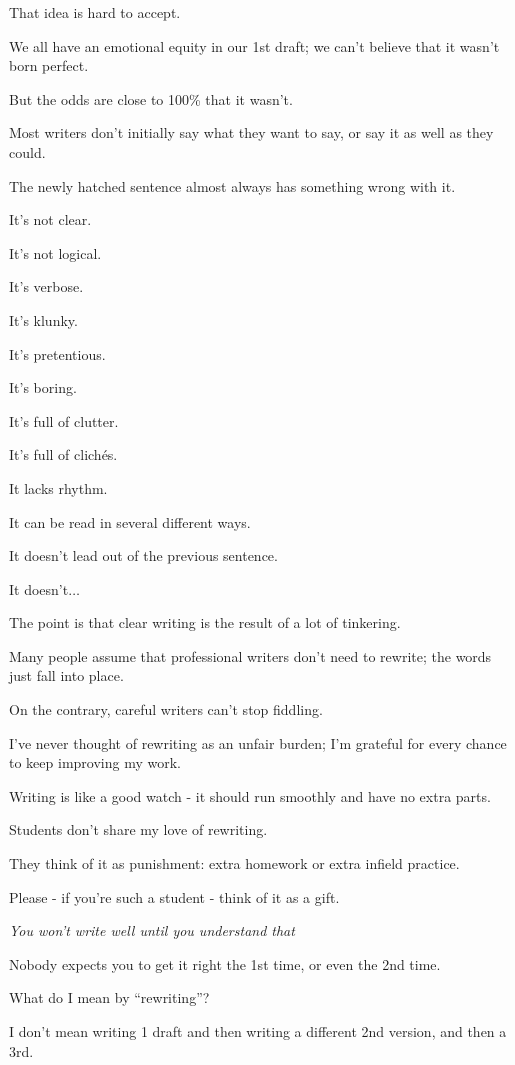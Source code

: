 \documentclass{book}
\numberwithin{equation}{section}
\begin{document}
That idea is hard to accept.

We all have an emotional equity in our 1st draft; we can't believe that it wasn't born perfect.

But the odds are close to 100\% that it wasn't.

Most writers don't initially say what they want to say, or say it as well as they could.

The newly hatched sentence almost always has something wrong with it.

It's not clear.

It's not logical.

It's verbose.

It's klunky.

It's pretentious.

It's boring.

It's full of clutter.

It's full of clich\'es.

It lacks rhythm.

It can be read in several different ways.

It doesn't lead out of the previous sentence.

It doesn't$\ldots$

The point is that clear writing is the result of a lot of tinkering.

%
Many people assume that professional writers don't need to rewrite; the words just fall into place.

On the contrary, careful writers can't stop fiddling.

I've never thought of rewriting as an unfair burden; I'm grateful for every chance to keep improving my work.

Writing is like a good watch - it should run smoothly and have no extra parts.

Students don't share my love of rewriting.

They think of it as punishment: extra homework or extra infield practice.

Please - if you're such a student - think of it as a gift.

\textit{You won't write well until you understand that} 

Nobody expects you to get it right the 1st time, or even the 2nd time.

%
What do I mean by ``rewriting''?

I don't mean writing 1 draft and then writing a different 2nd version, and then a 3rd.
\end{document}
